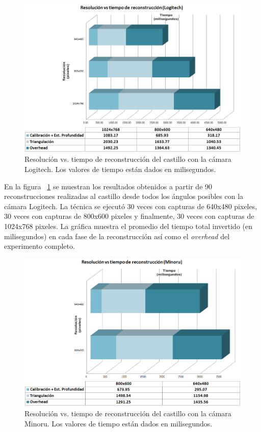 \begin{figure}[H]
\centering
\includegraphics[width=1.0\textwidth]{images/chart-cl1.png}
\caption[Resoluci\'{o}n vs. tiempo de reconstrucci\'{o}n del castillo con la c\'{a}mara Logitech]%
{Resoluci\'{o}n vs. tiempo de reconstrucci\'{o}n del castillo con la c\'{a}mara Logitech. Los valores de tiempo est\'{a}n dados en milisegundos.}
\label{fig:ChartCL1}
\end{figure}


En la figura ~\ref{fig:ChartCL1} se muestran los resultados obtenidos a partir de 90 reconstrucciones realizadas al castillo desde todos los \'{a}ngulos posibles con la c\'{a}mara Logitech. La t\'{e}cnica se ejecut\'{o} 30 veces con capturas de 640x480 pixeles, 30 veces con capturas de 800x600 pixeles y finalmente, 30 veces con capturas de 1024x768 pixeles. La gr\'{a}fica muestra el promedio del tiempo total invertido (en milisegundos) en cada fase de la reconstrucci\'{o}n as\'{i} como el \textit{overhead} del experimento completo.


\begin{figure}[H]
\centering
\includegraphics[width=1.0\textwidth]{images/chart-cm1.png}
\caption[Resoluci\'{o}n vs. tiempo de reconstrucci\'{o}n del castillo con la c\'{a}mara Minoru]%
{Resoluci\'{o}n vs. tiempo de reconstrucci\'{o}n del castillo con la c\'{a}mara Minoru. Los valores de tiempo est\'{a}n dados en milisegundos.}
\label{fig:ChartCM1}
\end{figure}


